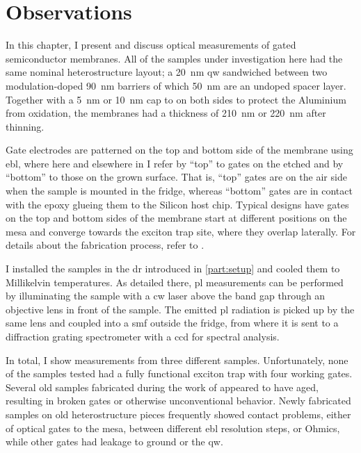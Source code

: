 \chapter{Observations}\label{ch:exp:observations}
In this chapter, I present and discuss optical measurements of gated semiconductor membranes.
All of the samples under investigation here had the same nominal heterostructure layout; a \qty{20}{\nano\meter}  \gls{qw} sandwiched between two modulation-doped \qty{90}{\nano\meter}  barriers of which \qty{50}{\nano\meter} are an undoped spacer layer.
Together with a \qty{5}{\nano\meter} or \qty{10}{\nano\meter}  cap to on both sides to protect the Aluminium from oxidation, the membranes had a thickness of \qty{210}{\nano\meter} or \qty{220}{\nano\meter} after thinning.

Gate electrodes are patterned on the top and bottom side of the membrane using \gls{ebl}, where here and elsewhere in \thethesis I refer by \enquote{top} to gates on the etched and by \enquote{bottom} to those on the grown surface.
That is, \enquote{top} gates are on the air side when the sample is mounted in the fridge, whereas \enquote{bottom} gates are in contact with the epoxy glueing them to the Silicon host chip.
Typical designs have gates on the top and bottom sides of the membrane start at different positions on the mesa and converge towards the exciton trap site, where they overlap laterally.
For details about the fabrication process, refer to .

I installed the samples in the \gls{dr} introduced in \cref{part:setup} and cooled them to Millikelvin temperatures.
As detailed there, \gls{pl} measurements can be performed by illuminating the sample with a \gls{cw} laser above the band gap through an objective lens in front of the sample.
The emitted \gls{pl} radiation is picked up by the same lens and coupled into a \gls{smf} outside the fridge, from where it is sent to a diffraction grating spectrometer with a \gls{ccd} for spectral analysis.

In total, I show measurements from three different samples.
Unfortunately, none of the samples tested had a fully functional exciton trap with four working gates.
Several old samples fabricated during the work of \citet{Descamps2021} appeared to have aged, resulting in broken gates or otherwise unconventional behavior.
Newly fabricated samples on old heterostructure pieces frequently showed contact problems, either of optical gates to the mesa, between different \gls{ebl} resolution steps, or Ohmics, while other gates had leakage to ground or the \gls{qw}.

